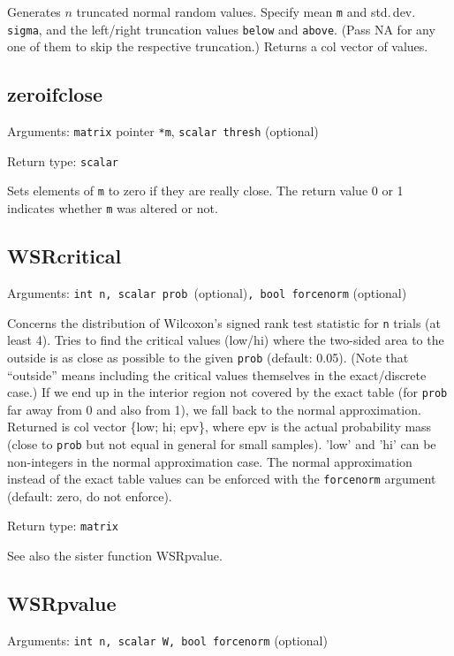 \documentclass[11pt,english]{article}
\begin{document}
Generates $n$ truncated normal random values. Specify mean \texttt{m}
and std.\,dev. \texttt{sigma}, and the left/right truncation values
\texttt{below} and \texttt{above}. (Pass NA for any one of them to
skip the respective truncation.) Returns a col vector of values.

\subsection{zeroifclose}

Arguments: \texttt{matrix} pointer \texttt{{*}m}, \texttt{scalar thresh}
(optional) 

\noindent Return type: \texttt{scalar}

Sets elements of \texttt{m} to zero if they are really close. The
return value 0 or 1 indicates whether \texttt{m} was altered or not.

\subsection{WSRcritical}

Arguments: \texttt{int n, scalar prob }(optional)\texttt{, bool forcenorm}
(optional)

Concerns the distribution of Wilcoxon's signed rank test statistic for
\texttt{n} trials (at least 4). Tries to find the critical values
(low/hi) where the two-sided area to the outside is as close as
possible to the given \texttt{prob} (default: 0.05). (Note that
``outside'' means including the critical
values themselves in the exact/discrete case.) If we end up in the
interior region not covered by the exact table (for \texttt{prob} far
away from 0 and also from 1), we fall back to the normal
approximation. Returned is col vector \{low; hi; epv\}, where epv is
the actual probability mass (close to \texttt{prob} but not equal in
general for small samples). 'low' and 'hi' can be non-integers in the
normal approximation case. The normal approximation instead of the
exact table values can be enforced with the \texttt{forcenorm}
argument (default: zero, do not enforce).

\noindent Return type: \texttt{matrix}

See also the sister function WSRpvalue.

\subsection{WSRpvalue}

Arguments: \texttt{int n, scalar W, bool forcenorm} (optional)
\end{document}
